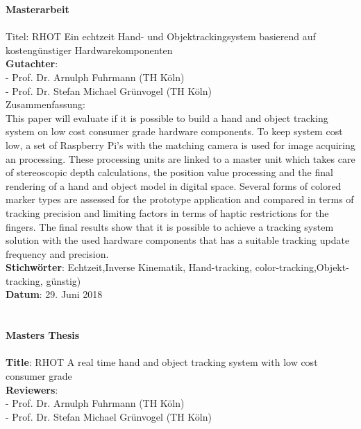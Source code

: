 \begin{titlepage}
\begin{figure}[!ht]
\begin{flushright}
\end{flushright}
\end{figure}
\newpage
\setcounter{page}{1}
\LARGE\textbf{Masterarbeit}\\\\
\small
Titel: RHOT Ein echtzeit Hand- und Objektrackingsystem basierend auf kostengünstiger Hardwarekomponenten\\
\textbf{Gutachter}:\\
	- Prof. Dr. Arnulph Fuhrmann (TH Köln)\\
	- Prof. Dr. Stefan Michael Grünvogel (TH Köln)\\
Zusammenfassung:\\ This paper will evaluate if it is possible to build a hand and object tracking system on low cost consumer grade hardware components. To keep system cost low, a set of Raspberry Pi's with the matching camera is used for image acquiring an processing. These processing units are linked to a master unit which takes care of stereoscopic depth calculations, the position value processing and the final rendering of a hand and object model in digital space. Several forms of colored marker types are assessed for the prototype application and compared in terms of tracking precision and limiting factors in terms of haptic restrictions for the fingers. The final results show that it is possible to achieve a tracking system solution with the used hardware components that has a suitable tracking update frequency and precision.\\
\textbf{Stichwörter}: Echtzeit,Inverse Kinematik, Hand-tracking, color-tracking,Objekt-tracking, günstig)\\
\textbf{Datum}: 29. Juni 2018\\\\\\
\LARGE \textbf{Masters Thesis}\\\\
\small
\textbf{Title}: RHOT A real time hand and object tracking system with low cost consumer grade\\
\textbf{Reviewers}:\\
	- Prof. Dr. Arnulph Fuhrmann (TH Köln)\\
	- Prof. Dr. Stefan Michael Grünvogel (TH Köln)\\

\end{titlepage}
